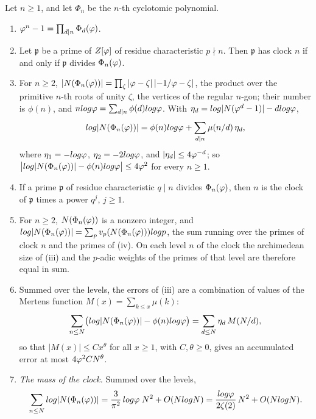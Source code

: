 \begin{proposition}\label{prop:clock-cyclotomic}
Let $n\geq1$, and let $\Phi_n$ be the $n$-th cyclotomic polynomial.
\begin{enumerate}[label=\textup{(\roman*)}]
  \item $\varphi^n-1=\prod_{d\mid n}\Phi_d(\varphi)$.
  \item Let $\mathfrak p$ be a prime of $Z[\varphi]$ of residue characteristic $p\nmid n$.  Then
    $\mathfrak p$ has clock $n$ if and only if $\mathfrak p$ divides $\Phi_n(\varphi)$.
  \item For $n\geq2$, $|N(\Phi_n(\varphi))|=\prod_\zeta|\varphi-\zeta|\,|{-1/\varphi}-\zeta|$,
    the product over the primitive $n$-th roots of unity $\zeta$, the vertices of the regular
    $n$-gon; their number is $\phi(n)$, and $nlog\varphi=\sum_{d\mid n}\phi(d)log\varphi$.
    With $\eta_d=log|N(\varphi^d-1)|-dlog\varphi$,
    \[
      log|N(\Phi_n(\varphi))|=\phi(n)log\varphi+\sum_{d\mid n}\mu(n/d)\,\eta_d ,
    \]
    where $\eta_1=-log\varphi$, $\eta_2=-2log\varphi$, and $|\eta_d|\leq4\varphi^{-d}$;
    so $\bigl|log|N(\Phi_n(\varphi))|-\phi(n)log\varphi\bigr|\leq4\varphi^2$ for every
    $n\geq1$.
  \item If a prime $\mathfrak p$ of residue characteristic $q\mid n$ divides $\Phi_n(\varphi)$,
    then $n$ is the clock of $\mathfrak p$ times a power $q^j$, $j\geq1$.
  \item For $n\geq2$, $N(\Phi_n(\varphi))$ is a nonzero integer, and
    $log|N(\Phi_n(\varphi))|=\sum_p v_p(N(\Phi_n(\varphi)))log p$, the sum running over the
    primes of clock $n$ and the primes of \textup{(iv)}.  On each level $n$ of the clock the
    archimedean size of \textup{(iii)} and the $p$-adic weights of the primes of that level are
    therefore equal in sum.
  \item Summed over the levels, the errors of \textup{(iii)} are a combination of values of
    the Mertens function $M(x)=\sum_{k\leq x}\mu(k)$:
    \[
      \sum_{n\leq N}\bigl(log|N(\Phi_n(\varphi))|-\phi(n)log\varphi\bigr)
      =\sum_{d\leq N}\eta_d\,M(N/d),
    \]
    so that $|M(x)|\leq Cx^\theta$ for all $x\geq1$, with $C,\theta\geq0$, gives an accumulated error at most
    $4\varphi^2CN^\theta$.
  \item \emph{The mass of the clock.}  Summed over the levels,
    \[
      \sum_{n\leq N}log|N(\Phi_n(\varphi))|=\frac{3}{\pi^2}\,log\varphi\;N^2+O(Nlog N)
      =\frac{log\varphi}{2\zeta(2)}\,N^2+O(Nlog N).
    \]
\end{enumerate}
\end{proposition}

